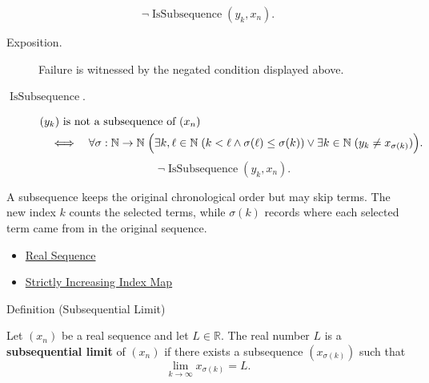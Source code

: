 \begin{remark*}
\[
\neg\operatorname{IsSubsequence}(y_k,x_n).
\]
\end{remark*}
\begin{remark*}
\begin{description}
  \item[Exposition.]
Failure is witnessed by the negated condition displayed above.
  \item[\(\operatorname{IsSubsequence}.\)]
\[
\begin{aligned}
&(y_k)\text{ is not a subsequence of }(x_n)\\
&\quad\Longleftrightarrow\quad
\forall \sigma:\mathbb{N}\to\mathbb{N}\;
\Bigl(
  \exists k,\ell\in\mathbb{N}\;(k<\ell\land \sigma(\ell)\le\sigma(k))
  \lor
  \exists k\in\mathbb{N}\;(y_k\neq x_{\sigma(k)})
\Bigr).
\end{aligned}
\]
\[
\neg\operatorname{IsSubsequence}(y_k,x_n).
\]
\end{description}
\end{remark*}

\begin{remark*}[Interpretation]
A subsequence keeps the original chronological order but may skip terms. The
new index $k$ counts the selected terms, while $\sigma(k)$ records where each
selected term came from in the original sequence.
\end{remark*}

\begin{dependencies}
\begin{itemize}
  \item \hyperref[def:real-sequence]{Real Sequence}
  \item \hyperref[def:strictly-increasing-index-map]{Strictly Increasing Index Map}
\end{itemize}
\end{dependencies}


\begin{definitionbox}{Definition (Subsequential Limit)}
\begin{definition}
\label{def:subsequential-limit}
Let $(x_n)$ be a real sequence and let $L\in\mathbb{R}$. The real number
$L$ is a \textbf{subsequential limit} of $(x_n)$ if there exists a
subsequence $(x_{\sigma(k)})$ such that
\[
  \lim_{k\to\infty} x_{\sigma(k)}=L.
\]
\end{definition}
\end{definitionbox}


